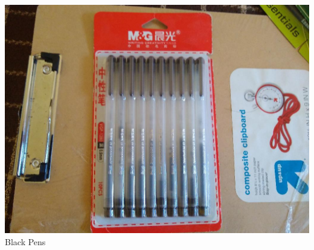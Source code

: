 \documentclass[t]{beamer}
\newcommand{\htarget}[2]{\hypertarget{#1}{#2}}
\begin{document}
\begin{frame}\htarget{blackpens}{} \begin{center}
\includegraphics[height=0.8\textheight]{black_pen_mini.jpg} \\
Black Pens
\end{center} \end{frame}
\end{document}
